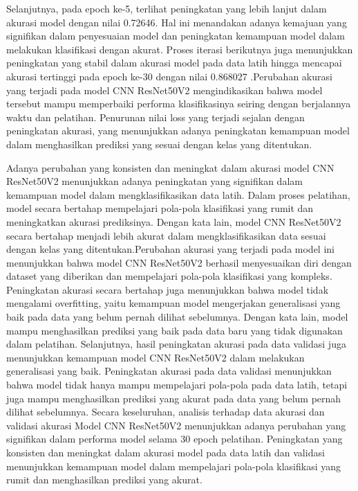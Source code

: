 Selanjutnya, pada epoch ke-5, terlihat peningkatan yang lebih lanjut dalam akurasi model dengan nilai 0.72646. Hal ini menandakan adanya kemajuan yang signifikan dalam penyesuaian model dan peningkatan kemampuan model dalam melakukan klasifikasi dengan akurat. Proses iterasi berikutnya juga menunjukkan peningkatan yang stabil dalam akurasi model pada data latih hingga mencapai akurasi tertinggi pada epoch ke-30 dengan nilai 0.868027 .Perubahan akurasi yang terjadi pada model CNN ResNet50V2 mengindikasikan bahwa model tersebut mampu memperbaiki performa klasifikasinya seiring dengan berjalannya waktu dan pelatihan. Penurunan nilai loss yang terjadi sejalan dengan peningkatan akurasi, yang menunjukkan adanya peningkatan kemampuan model dalam menghasilkan prediksi yang sesuai dengan kelas yang ditentukan.

Adanya perubahan yang konsisten dan meningkat dalam akurasi model CNN ResNet50V2 menunjukkan adanya peningkatan yang signifikan dalam kemampuan model dalam mengklasifikasikan data latih. Dalam proses pelatihan, model secara bertahap mempelajari pola-pola klasifikasi yang rumit dan meningkatkan akurasi prediksinya. Dengan kata lain, model CNN ResNet50V2 secara bertahap menjadi lebih akurat dalam mengklasifikasikan data sesuai dengan kelas yang ditentukan.Perubahan akurasi yang terjadi pada model ini menunjukkan bahwa model CNN ResNet50V2 berhasil menyesuaikan diri dengan dataset yang diberikan dan mempelajari pola-pola klasifikasi yang kompleks. Peningkatan akurasi secara bertahap juga menunjukkan bahwa model tidak mengalami overfitting, yaitu kemampuan model mengerjakan generalisasi yang baik pada data yang belum pernah dilihat sebelumnya. Dengan kata lain, model mampu menghasilkan prediksi yang baik pada data baru yang tidak digunakan dalam pelatihan. Selanjutnya, hasil peningkatan akurasi pada data validasi juga menunjukkan kemampuan model CNN ResNet50V2 dalam melakukan generalisasi yang baik. Peningkatan akurasi pada data validasi menunjukkan bahwa model tidak hanya mampu mempelajari pola-pola pada data latih, tetapi juga mampu menghasilkan prediksi yang akurat pada data yang belum pernah dilihat sebelumnya. Secara keseluruhan, analisis terhadap data akurasi dan validasi akurasi Model CNN ResNet50V2 menunjukkan adanya perubahan yang signifikan dalam performa model selama 30 epoch pelatihan. Peningkatan yang konsisten dan meningkat dalam akurasi model pada data latih dan validasi menunjukkan kemampuan model dalam mempelajari pola-pola klasifikasi yang rumit dan menghasilkan prediksi yang akurat.
